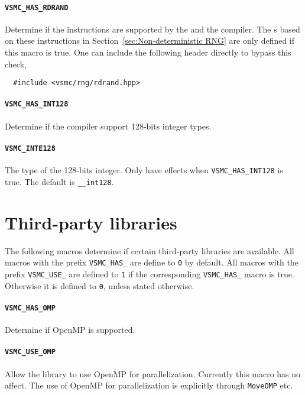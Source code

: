\paragraph{\texttt{VSMC\_HAS\_RDRAND}} Determine if the \rdrand instructions
are supported by the \cpu and the compiler. The \rng{}s based on these
instructions in Section~\ref{sec:Non-deterministic RNG} are only defined if
this macro is true. One can include the following header directly to bypass
this check,
\begin{Verbatim}
  #include <vsmc/rng/rdrand.hpp>
\end{Verbatim}

\paragraph{\texttt{VSMC\_HAS\_INT128}} Determine if the compiler support
128-bits integer types.

\paragraph{\texttt{VSMC\_INTE128}} The type of the 128-bits integer. Only have
effects when \verb|VSMC_HAS_INT128| is true. The default is \verb|__int128|.

\section{Third-party libraries}
\label{sec:Third-party libraries}

The following macros determine if certain third-party libraries are available.
All macros with the prefix \verb|VSMC_HAS_| are define to \verb|0| by default.
All macros with the prefix \verb|VSMC_USE_| are defined to \verb|1| if the
corresponding \verb|VSMC_HAS_| macro is true. Otherwise it is defined to
\verb|0|, unless stated otherwise.

\paragraph{\texttt{VSMC\_HAS\_OMP}} Determine if OpenMP is supported.

\paragraph{\texttt{VSMC\_USE\_OMP}} Allow the library to use OpenMP for
parallelization. Currently this macro has no affect. The use of OpenMP for
parallelization is explicitly through \verb|MoveOMP| etc.

